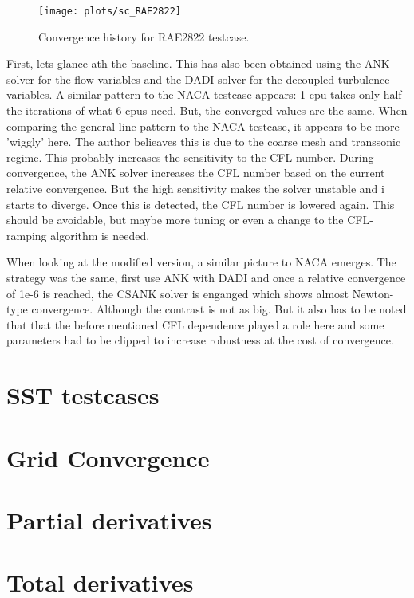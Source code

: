 \begin{figure}[H] \centering
    \texttt{[image: plots/sc\_RAE2822]}
    \caption{Convergence history for RAE2822 testcase.}
    \label{fig:sc_RAE2822}
\end{figure}

\noindent First, lets glance ath the baseline. This has also been obtained
using the ANK solver for the flow variables and the DADI solver for the
decoupled turbulence variables. A similar pattern to the NACA
testcase appears: 1 cpu takes only half the iterations of what 6 cpus need.
But, the converged values are the same. When comparing the general line pattern
to the NACA testcase, it appears to be more 'wiggly' here. The author belieaves
this is due to the coarse mesh and transsonic regime. This probably increases
the sensitivity to the CFL number. During convergence, the ANK solver increases
the CFL number based on the current relative convergence. But the high
sensitivity makes the solver unstable and i starts to diverge. Once this is
detected, the CFL number is lowered again. This should be avoidable, but maybe
more tuning or even a change to the CFL-ramping algorithm is needed.

When looking at the modified version, a similar picture to NACA emerges. The
strategy was the same, first use ANK with DADI and once a relative convergence
of 1e-6 is reached, the CSANK solver is enganged which shows almost Newton-type
convergence. Although the contrast is not as big. But it also has to be noted
that that the before mentioned CFL dependence played a role here and some
parameters had to be clipped to increase robustness at the cost of convergence.





\section{SST testcases}

\section{Grid Convergence}

\section{Partial derivatives}

\section{Total derivatives}
